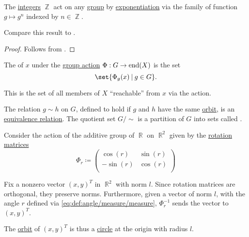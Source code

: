\begin{proposition}\label{thm:exponentiation_group_action}
  The \hyperref[def:integers]{integers} \( \BbbZ \) act on any \hyperref[def:group]{group} by \hyperref[def:monoid/exponentiation]{exponentiation} via the family of function \( g \mapsto g^n \) indexed by \( n \in \BbbZ \).

  Compare this result to .
\end{proposition}
\begin{proof}
  Follows from .
\end{proof}

\begin{definition}\label{def:group_action_orbit}
  The  of \( x \) under the \hyperref[def:group_action]{group action} \( \Phi: G \to \operatorname{end}(X) \) is the set
  \begin{equation*}
    \set{ \Phi_g(x) \given g \in G }.
  \end{equation*}

  This is the set of all members of \( X \) \enquote{reachable} from \( x \) via the action.

  The relation \( g \sim h \) on \( G \), defined to hold if \( g \) and \( h \) have the same \hyperref[def:group_action_orbit]{orbit}, is an \hyperref[def:equivalence_relation]{equivalence relation}. The quotient set \( G / {\sim} \) is a partition of \( G \) into sets called .
\end{definition}

\begin{example}\label{ex:plane_rotation_action_orbits}
  Consider the action of the additive group of \( \BbbR \) on \( \BbbR^2 \) given by the \hyperref[def:rigid_motion/rotation]{rotation} \hyperref[def:array/matrix]{matrices}
  \begin{equation*}
    \Phi_r \coloneqq \begin{pmatrix}
      \cos(r)  & \sin(r) \\
      -\sin(r) & \cos(r) \\
    \end{pmatrix}
  \end{equation*}

  Fix a nonzero vector \( (x, y)^T \) in \( \BbbR^2 \) with norm \( l \). Since rotation matrices are orthogonal, they preserve norms. Furthermore, given a vector of norm \( l \), with the angle \( r \) defined via \eqref{eq:def:angle/measure/measure}, \( \Phi_r^{-1} \) sends the vector to \( (x, y)^T \).

  The \hyperref[def:group_action_orbit]{orbit} of \( (x, y)^T \) is thus a \hyperref[def:circle]{circle} at the origin with radius \( l \).
\end{example}

